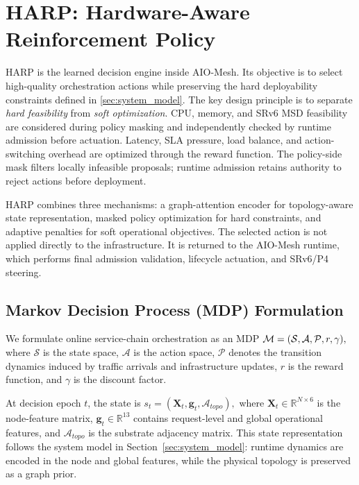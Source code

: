 \documentclass[final,5p]{elsarticle}
\newcommand{\rev}[1]{\textcolor{revisiongreen}{#1}}
\let\newrev\rev
\begin{document}
\section{HARP: Hardware-Aware Reinforcement Policy}
\label{sec:harp}

HARP is the learned decision engine inside AIO-Mesh. Its objective is to select high-quality orchestration actions while preserving the hard deployability constraints defined in \autoref{sec:system_model}. The key design principle is to separate \emph{hard feasibility} from \emph{soft optimization}. CPU, memory, and SRv6 MSD feasibility are \rev{considered during policy masking and independently checked by runtime admission} before actuation. Latency, SLA pressure, load balance, and \rev{action-switching overhead} are optimized through the reward function. \rev{The policy-side mask filters locally infeasible proposals; runtime admission retains authority to reject actions before deployment.}

HARP combines three mechanisms: a graph-attention encoder for topology-aware state representation, masked policy optimization for hard constraints, and adaptive penalties for soft operational objectives. The selected action is not applied directly to the infrastructure. It is returned to the AIO-Mesh runtime, which performs final admission validation, lifecycle actuation, and SRv6/P4 steering.

\subsection{\newrev{Markov Decision Process (MDP) Formulation}}
\label{subsec:harp_mdp}

We formulate online service-chain orchestration as an \newrev{MDP}
$ \rev{\mathcal{M}=(\mathcal{S},\mathcal{A},\mathcal{P},r,\gamma),}$
where \(\mathcal{S}\) is the state space, \(\mathcal{A}\) is the action space, \(\mathcal{P}\) denotes the transition dynamics induced by traffic arrivals and infrastructure updates, \rev{\(r\)} is the reward function, and \(\gamma\) is the discount factor.

At decision epoch \(t\), the state is $ s_t=(\mathbf{X}_t,\mathbf{g}_t,\mathcal{A}_{topo}),$
where \(\mathbf{X}_t\in\mathbb{R}^{N\times 6}\) is the node-feature matrix, \(\mathbf{g}_t\in\mathbb{R}^{13}\) contains request-level and global operational features, and \(\mathcal{A}_{topo}\) is the substrate adjacency matrix. This state representation follows the system model in Section~\ref{sec:system_model}: runtime dynamics are encoded in the node and global features, while the physical topology is preserved as a graph prior.
\end{document}
